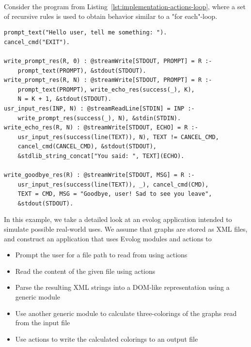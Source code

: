 Consider the program from Listing~\ref{lst:implementation-actions-loop}, where a set of recursive rules is used to obtain behavior similar to a "for each"-loop.

\begin{lstlisting}[style=asp-code, label={lst:implementation-actions-loop}, caption={An "echo" application which echoes user input written using Evolog actions.}]
prompt_text("Hello user, tell me something: ").
cancel_cmd("EXIT").
    
write_prompt_res(R, 0) : @streamWrite[STDOUT, PROMPT] = R :- 
    prompt_text(PROMPT), &stdout(STDOUT).
write_prompt_res(R, N) : @streamWrite[STDOUT, PROMPT] = R :- 
    prompt_text(PROMPT), write_echo_res(success(_), K), 
    N = K + 1, &stdout(STDOUT).
usr_input_res(INP, N) : @streamReadLine[STDIN] = INP :- 
    write_prompt_res(success(_), N), &stdin(STDIN).
write_echo_res(R, N) : @streamWrite[STDOUT, ECHO] = R :- 
    usr_input_res(success(line(TEXT)), N), TEXT != CANCEL_CMD, 
    cancel_cmd(CANCEL_CMD), &stdout(STDOUT),
    &stdlib_string_concat["You said: ", TEXT](ECHO).
        
write_goodbye_res(R) : @streamWrite[STDOUT, MSG] = R :- 
    usr_input_res(success(line(TEXT)), _), cancel_cmd(CMD), 
    TEXT = CMD, MSG = "Goodbye, user! Sad to see you leave", 
    &stdout(STDOUT).   
\end{lstlisting}    



\begin{example}
In this example, we take a detailed look at an evolog application intended to simulate possible real-world uses. We assume that graphs are stored as XML files, and construct an application that uses Evolog modules and actions to
\begin{itemize}
    \item Prompt the user for a file path to read from using actions
    \item Read the content of the given file using actions
    \item Parse the resulting XML strings into a DOM-like representation using a generic module
    \item Use another generic module to calculate three-colorings of the graphs read from the input file
    \item Use actions to write the calculated colorings to an output file
\end{itemize}        
\label{ex:implementation-actions-program-with-guesses}
\end{example}    

